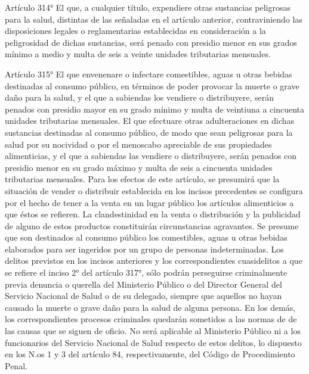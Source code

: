     Artículo 314° El que, a cualquier título, expendiere otras sustancias peligrosas para la salud, distintas de las señaladas en el artículo anterior, contraviniendo las disposiciones legales o reglamentarias establecidas en consideración a la peligrosidad de dichas sustancias, será penado con presidio menor en sus grados mínimo a medio y multa de seis a veinte unidades tributarias mensuales.






    Artículo 315° El que envenenare o infectare comestibles, aguas u otras bebidas destinadas al consumo público, en términos de poder provocar la muerte o grave daño para la salud, y el que a sabiendas los vendiere o distribuyere, serán penados con presidio mayor en su grado mínimo y multa de veintiuna a cincuenta unidades tributarias mensuales.
    El que efectuare otras adulteraciones en dichas sustancias destinadas al consumo público, de modo que sean peligrosas para la salud por su nocividad o por el menoscabo apreciable de sus propiedades alimenticias, y el que a sabiendas las vendiere o distribuyere, serán penados con presidio menor en su grado máximo y multa de seis a cincuenta unidades tributarias mensuales.
    Para los efectos de este artículo, se presumirá que la situación de vender o distribuir establecida en los incisos precedentes se configura por el hecho de tener a la venta en un lugar público los artículos alimenticios a que éstos se refieren. La clandestinidad en la venta o distribución y la publicidad de alguno de estos productos constituirán circunstancias agravantes.
    Se presume que son destinados al consumo público los comestibles, aguas u otras bebidas elaborados para ser ingeridos por un grupo de personas indeterminadas.
    Los delitos previstos en los incisos anteriores y los correspondientes cuasidelitos a que se refiere el inciso 2° del artículo 317°, sólo podrán perseguirse criminalmente previa denuncia o querella del Ministerio Público o del Director General del Servicio Nacional de Salud o de su delegado, siempre que aquellos no hayan causado la muerte o grave daño para la salud de alguna persona. En los demás, los correspondientes procesos criminales quedarán sometidos a las normas de de las causas que se siguen de oficio.
    No será aplicable al Ministerio Público ni a los funcionarios del Servicio Nacional de Salud respecto de estos delitos, lo dispuesto en los N.os 1 y 3 del artículo 84, respectivamente, del Código de Procedimiento Penal.






